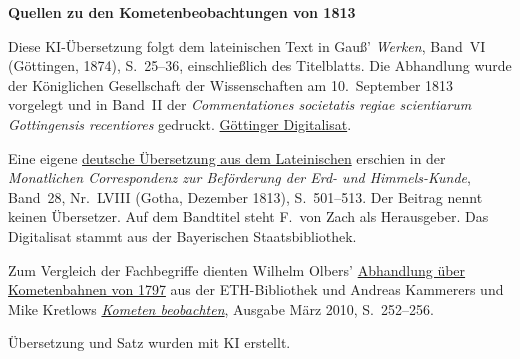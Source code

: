 \clearpage\thispagestyle{empty}
\begin{center}\textbf{Quellen zu den Kometenbeobachtungen von 1813}\end{center}
\noindent Diese KI-Übersetzung folgt dem lateinischen Text in Gauß’ \textit{Werken}, Band~VI (Göttingen, 1874), S.~25--36, einschließlich des Titelblatts. Die Abhandlung wurde der Königlichen Gesellschaft der Wissenschaften am 10.~September 1813 vorgelegt und in Band~II der \textit{Commentationes societatis regiae scientiarum Gottingensis recentiores} gedruckt. \href{https://gdz.sub.uni-goettingen.de/id/PPN236007467}{Göttinger Digitalisat}.
\par\smallskip\noindent Eine eigene \href{https://www.digitale-sammlungen.de/de/view/bsb10538617?page=517}{deutsche Übersetzung aus dem Lateinischen} erschien in der \textit{Monatlichen Correspondenz zur Beförderung der Erd- und Himmels-Kunde}, Band~28, Nr.~LVIII (Gotha, Dezember 1813), S.~501--513. Der Beitrag nennt keinen Übersetzer. Auf dem Bandtitel steht F.~von Zach als Herausgeber. Das Digitalisat stammt aus der Bayerischen Staatsbibliothek.
\par\smallskip\noindent Zum Vergleich der Fachbegriffe dienten Wilhelm Olbers’ \href{https://www.e-rara.ch/zut/content/titleinfo/449756}{Abhandlung über Kometenbahnen von 1797} aus der ETH-Bibliothek und Andreas Kammerers und Mike Kretlows \href{https://fg-kometen.vdsastro.de/Publ/kometen_beobachten_2.0.pdf}{\textit{Kometen beobachten}}, Ausgabe März 2010, S.~252--256.
\par\smallskip\noindent Übersetzung und Satz wurden mit KI erstellt.
\clearpage
